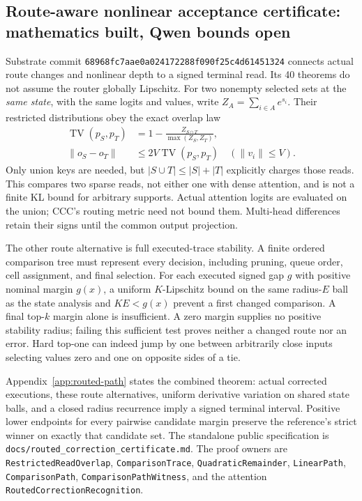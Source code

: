 \documentclass[11pt]{article}
\numberwithin{equation}{section}
\begin{document}
\subsection{Route-aware nonlinear acceptance certificate: mathematics built, Qwen bounds open}

Substrate commit \texttt{68968fc7aae0a0241722\allowbreak88f090f25c4d61451324} connects actual route changes
and nonlinear depth to a signed terminal read. Its 40 theorems do not assume the router globally Lipschitz.
For two nonempty selected sets at the \emph{same state}, with the same logits and values, write
$Z_A=\sum_{i\in A}e^{s_i}$. Their restricted distributions obey the exact overlap law
\begin{equation}\label{eq:routed-overlap}
\begin{split}
\operatorname{TV}(p_S,p_T)&=1-\frac{Z_{S\cap T}}{\max(Z_S,Z_T)},\\
\|o_S-o_T\|&\le2V\operatorname{TV}(p_S,p_T)\quad(\|v_i\|\le V).
\end{split}
\end{equation}
Only union keys are needed, but $|S\cup T|\le|S|+|T|$ explicitly charges those reads. This compares
two sparse reads, not either one with dense attention, and is not a finite KL bound for arbitrary
supports. Actual attention logits are evaluated on the union; CCC's routing metric need not bound them.
Multi-head differences retain their signs until the common output projection.

The other route alternative is full executed-trace stability. A finite ordered comparison tree must
represent every decision, including pruning, queue order, cell assignment, and final selection. For each
executed signed gap $g$ with positive nominal margin $g(x)$, a uniform $K$-Lipschitz bound on the same
radius-$E$ ball as the state analysis and $KE<g(x)$ prevent a first changed comparison. A final top-$k$
margin alone is insufficient. A zero margin supplies no positive stability radius; failing this sufficient
test proves neither a changed route nor an error. Hard top-one can indeed jump by one between arbitrarily
close inputs selecting values zero and one on opposite sides of a tie.

Appendix~\ref{app:routed-path} states the combined theorem: actual corrected executions, these route
alternatives, uniform derivative variation on shared state balls, and a closed radius recurrence imply a
signed terminal interval. Positive lower endpoints for every pairwise candidate margin preserve the
reference's strict winner on exactly that candidate set. The standalone public specification is
\nolinkurl{docs/routed_correction_certificate.md}. The proof owners are
{\small\texttt{RestrictedReadOverlap}, \texttt{ComparisonTrace}, \texttt{QuadraticRemainder},
\texttt{LinearPath}, \texttt{ComparisonPath}, \texttt{ComparisonPathWitness}}, and the attention
{\small\texttt{RoutedCorrectionRecognition}}.
\end{document}
